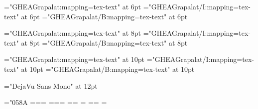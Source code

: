 \font\hysix="GHEAGrapalat:mapping=tex-text" at 6pt
\font\hysixi="GHEAGrapalat/I:mapping=tex-text" at 6pt
\font\hysixb="GHEAGrapalat/B:mapping=tex-text" at 6pt

\font\hyeight="GHEAGrapalat:mapping=tex-text" at 8pt
\font\hyeighti="GHEAGrapalat/I:mapping=tex-text" at 8pt
\font\hyeightb="GHEAGrapalat/B:mapping=tex-text" at 8pt

\font\hyten="GHEAGrapalat:mapping=tex-text" at 10pt
\font\hyteni="GHEAGrapalat/I:mapping=tex-text" at 10pt
\font\hytenb="GHEAGrapalat/B:mapping=tex-text" at 10pt

\def\tenpoint{%
    \def\am{\fam0\hyten}%
    \textfont0=\tenrm \scriptfont0=\sevenrm \scriptscriptfont0=\fiverm
    \textfont1=\teni \scriptfont1=\seveni \scriptscriptfont1=\fivei
    \textfont\itfam=\hyteni \scriptfont\itfam=\hyeighti 
      \scriptscriptfont\itfam=\hysixi \def\it{\fam\itfam\hyteni}%
    \textfont\bffam=\hytenb \scriptfont\bffam=\hyeightb
      \scriptscriptfont\bffam=\hysixb \def\bf{\fam\bffam\hytenb}%
    \normalbaselineskip=16pt
    \normalbaselines\am}

\font\symbol="DejaVu Sans Mono" at 12pt

\pdfpagewidth=105mm
\pdfpageheight=148.5mm

\hsize=90mm
\vsize=133mm

\hoffset=-17.9mm
\voffset=-22.4mm

\parindent=0pt
\nopagenumbers


\newcount\problemcount {}
\def\problem{%
  \ifnum\problemcount>0\solution\fi
  \vfill\eject\tenpoint%
  \advance\problemcount by1\null}

\newdimen\freespace
\def\solution{\bigskip
{\symbol\offinterlineskip
  \freespace\vsize \advance\freespace-\pagetotal
  \special{color push rgb 0.5 0.6 0.7}
    \centerline{┌─┬─┬─┬─┬─┬─┬─┬─┬─┬─┬─┬─┬─┬─┬─┬─┬─┐}
  \loop
    \centerline{├─┼─┼─┼─┼─┼─┼─┼─┼─┼─┼─┼─┼─┼─┼─┼─┼─┤}
    \advance\freespace by -15pt
  \ifdim\freespace>60pt\repeat
    \centerline{└─┴─┴─┴─┴─┴─┴─┴─┴─┴─┴─┴─┴─┴─┴─┴─┴─┘}
  \special{color pop}}
  \medskip\line{Պատասխան՝~\dotfill}}

\frenchspacing
\hyphenchar\hyten="058A %
\tenpoint
{}


